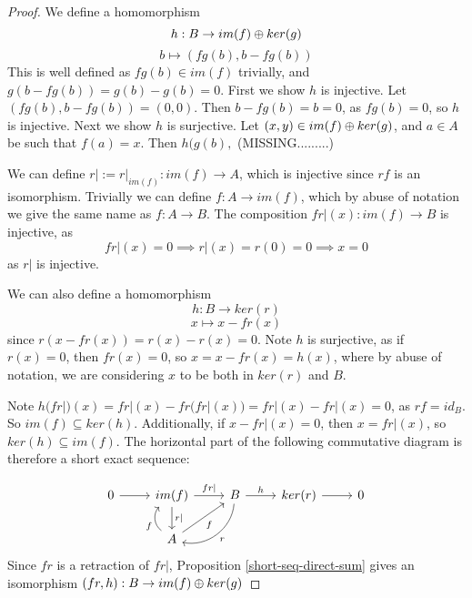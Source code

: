 \begin{proof}
We define a homomorphism $$h:B\rightarrow im(f)\oplus ker(g)$$
$$b\mapsto (fg(b),b-fg(b))$$
This is well defined as $fg(b)\in im(f)$ trivially, and $g(b-fg(b))=g(b)-g(b)=0$.
First we show $h$ is injective. Let $(fg(b),b-fg(b))=(0,0)$. Then $b-fg(b)=b=0$, as $fg(b)=0$, so $h$ is injective. Next we show $h$ is surjective. Let $(x,y)\in im(f)\oplus ker(g)$, and $a\in A$ be such that $f(a)=x$. Then $h(g(b),$ (MISSING.........)



We can define $r|:=r|_{im(f)}:im(f)\rightarrow A$, which is injective since $rf$ is an isomorphism. Trivially we can define $f:A\rightarrow im(f)$, which by abuse of notation we give the same name as $f:A\rightarrow B$. The composition $fr|(x):im(f)\rightarrow B$ is injective, as $$fr|(x)=0\implies r|(x)=r(0)=0\implies x=0$$
as $r|$ is injective.

We can also define a homomorphism $$h:B\rightarrow ker(r)$$
$$x\mapsto x-fr(x)$$
since $r(x-fr(x))=r(x)-r(x)=0$. Note $h$ is surjective, as if $r(x)=0$, then $fr(x)=0$, so $x=x-fr(x)=h(x)$, where by abuse of notation, we are considering $x$ to be both in $ker(r)$ and $B$.

Note $h(fr|)(x)=fr|(x)-fr(fr|(x))=fr|(x)-fr|(x)=0$, as $rf=id_B$. So $im(f)\subseteq ker(h)$. Additionally, if $x-fr|(x)=0$, then $x=fr|(x)$, so $ker(h)\subseteq im(f)$. The horizontal part of the following commutative diagram is therefore a short exact sequence:

\[\begin{tikzcd}
0 \arrow[r] & im(f) \arrow[d, "r|"] \arrow[r, "fr|"]          & B \arrow[ld, "r", bend left=49] \arrow[r, "h"] & ker(r) \arrow[r] & 0 \\
            & A \arrow[u, "f", bend left=49] \arrow[ru, "f"'] &                                                &                  &  
\end{tikzcd}\]
Since $fr$ is a retraction of $fr|$, Proposition \ref{short-seq-direct-sum} gives an isomorphism $(fr,h):B\rightarrow im(f)\oplus ker(g)$
\end{proof}

